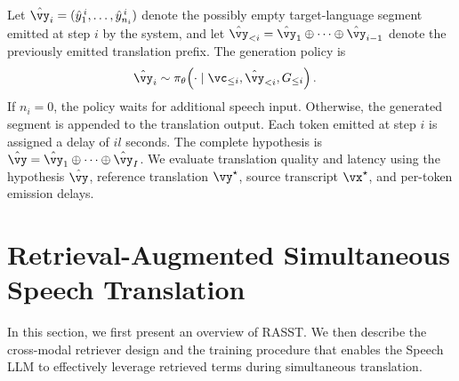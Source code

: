 Let
$\hat{\vy}_i=(\hat{y}^{\,i}_1,\ldots,\hat{y}^{\,i}_{n_i})$
denote the possibly empty target-language segment emitted at step $i$ by the system, and let
$\hat{\vy}_{<i}=\hat{\vy}_1\oplus\cdots\oplus\hat{\vy}_{i-1}$
denote the previously emitted translation prefix. The generation policy is
\begin{align}
\hat{\vy}_i
&\sim
\pi_\theta\!\left(
\cdot
\mid
\vc_{\leq i},
\hat{\vy}_{<i},
G_{\leq i}
\right).
\end{align}
If $n_i=0$, the policy waits for additional speech input. Otherwise, the generated segment is appended to the translation output. Each token emitted at step $i$ is assigned a delay of $i l$ seconds. The complete hypothesis is
$\hat{\vy}=\hat{\vy}_1\oplus\cdots\oplus\hat{\vy}_I$.
We evaluate translation quality and latency using the hypothesis $\hat{\vy}$, reference translation $\vy^\star$, source transcript $\vx^\star$, and per-token emission delays.

\section{Retrieval-Augmented Simultaneous Speech Translation}
\label{sec:method}

In this section, we first present an overview of RASST. We then describe the cross-modal retriever design and the training procedure that enables the Speech LLM to effectively leverage retrieved terms during simultaneous translation.



